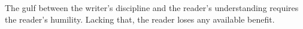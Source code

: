 

The gulf between the writer’s discipline and the \break reader’s understanding requires the reader’s humility. \break  Lacking that, the reader loses any available benefit.
\bye
